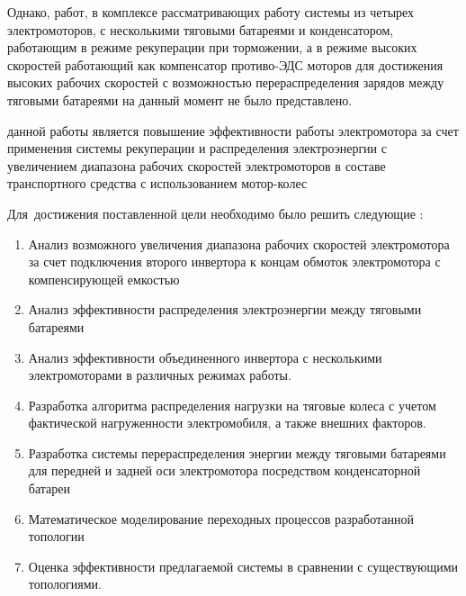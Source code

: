 Однако, работ, в комплексе рассматривающих работу системы из четырех электромоторов, с несколькими тяговыми батареями и конденсатором, работающим в режиме рекуперации при торможении, а в режиме высоких скоростей работающий как компенсатор противо-ЭДС моторов для достижения высоких рабочих скоростей с возможностью перераспределения зарядов между тяговыми батареями на данный момент не было представлено.




{\aim} данной работы является повышение эффективности работы электромотора за счет применения системы рекуперации и распределения электроэнергии с увеличением диапазона рабочих скоростей электромоторов в составе транспортного средства с использованием мотор-колес

Для~достижения поставленной цели необходимо было решить следующие {\tasks}:
\begin{enumerate}
  \item Анализ возможного увеличения диапазона рабочих скоростей электромотора за счет подключения второго инвертора к концам обмоток электромотора с компенсирующей 	емкостью
  \item Анализ эффективности распределения электроэнергии между тяговыми батареями
  \item Анализ эффективности   объединенного инвертора с несколькими электромоторами в 	различных режимах работы.
  \item Разработка алгоритма распределения нагрузки на тяговые колеса с учетом фактической нагруженности электромобиля, а также внешних факторов.
  \item Разработка системы перераспределения энергии между тяговыми батареями для передней и задней оси электромотора посредством конденсаторной батареи
  \item	Математическое моделирование переходных процессов разработанной топологии
  \item Оценка эффективности предлагаемой системы в сравнении с существующими топологиями.
\end{enumerate}


